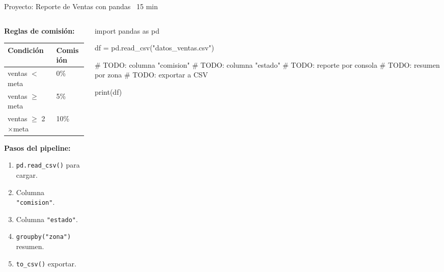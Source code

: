 \documentclass[aspectratio=169, 11pt]{beamer}
\begin{document}
\begin{frame}[fragile,shrink=28]{Proyecto: Reporte de Ventas con pandas \hfill
    {\normalsize\color{arcaRed}\faClock\ 15 min}}
  \vspace{-6pt}
  \begin{columns}[T]
    \begin{column}{0.52\textwidth}
      {\footnotesize\color{arcaDark}\bfseries Reglas de comisión:}
      \vspace{2pt}

      {\scriptsize
      \begin{tabular}{@{}ll@{}}
        \toprule
        \textbf{Condición} & \textbf{Comisión} \\
        \midrule
        ventas $<$ meta & 0\% \\
        ventas $\geq$ meta & 5\% \\
        ventas $\geq$ 2$\times$meta & 10\% \\
        \bottomrule
      \end{tabular}
      }

      \vspace{6pt}
      {\footnotesize\color{arcaDark}\bfseries Pasos del pipeline:}
      {\scriptsize
      \begin{enumerate}\setlength{\itemsep}{2pt}
        \item \texttt{pd.read\_csv()} para cargar.
        \item Columna \texttt{"comision"}.
        \item Columna \texttt{"estado"}.
        \item \texttt{groupby("zona")} resumen.
        \item \texttt{to\_csv()} exportar.
      \end{enumerate}
      }
    \end{column}

    \begin{column}{0.44\textwidth}
      \begin{pyblock}[minted options={fontsize=\scriptsize, breaklines}]
import pandas as pd

df = pd.read_csv("datos_ventas.csv")

# TODO: columna "comision"
# TODO: columna "estado"
# TODO: reporte por consola
# TODO: resumen por zona
# TODO: exportar a CSV

print(df)
      \end{pyblock}
    \end{column}
  \end{columns}
\end{frame}
\end{document}
